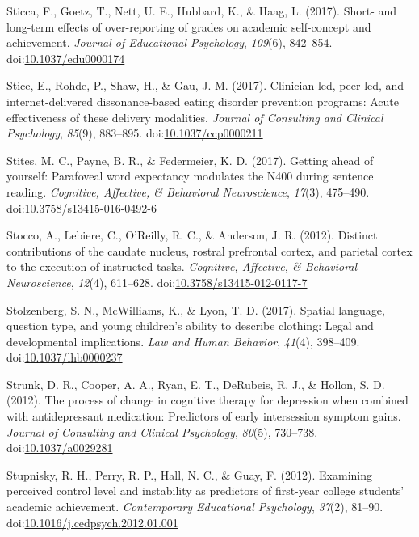 \documentclass[english,man]{apa6}
\theoremstyle{definition}
\theoremstyle{definition}
\theoremstyle{definition}
\theoremstyle{remark}
\begin{document}
\hypertarget{ref-Sticca2017}{}
Sticca, F., Goetz, T., Nett, U. E., Hubbard, K., \& Haag, L. (2017).
Short- and long-term effects of over-reporting of grades on academic
self-concept and achievement. \emph{Journal of Educational Psychology},
\emph{109}(6), 842--854.
doi:\href{https://doi.org/10.1037/edu0000174}{10.1037/edu0000174}

\hypertarget{ref-Stice2017a}{}
Stice, E., Rohde, P., Shaw, H., \& Gau, J. M. (2017). Clinician-led,
peer-led, and internet-delivered dissonance-based eating disorder
prevention programs: Acute effectiveness of these delivery modalities.
\emph{Journal of Consulting and Clinical Psychology}, \emph{85}(9),
883--895.
doi:\href{https://doi.org/10.1037/ccp0000211}{10.1037/ccp0000211}

\hypertarget{ref-Stites2017}{}
Stites, M. C., Payne, B. R., \& Federmeier, K. D. (2017). Getting ahead
of yourself: Parafoveal word expectancy modulates the N400 during
sentence reading. \emph{Cognitive, Affective, \& Behavioral
Neuroscience}, \emph{17}(3), 475--490.
doi:\href{https://doi.org/10.3758/s13415-016-0492-6}{10.3758/s13415-016-0492-6}

\hypertarget{ref-Stocco2012}{}
Stocco, A., Lebiere, C., O'Reilly, R. C., \& Anderson, J. R. (2012).
Distinct contributions of the caudate nucleus, rostral prefrontal
cortex, and parietal cortex to the execution of instructed tasks.
\emph{Cognitive, Affective, \& Behavioral Neuroscience}, \emph{12}(4),
611--628.
doi:\href{https://doi.org/10.3758/s13415-012-0117-7}{10.3758/s13415-012-0117-7}

\hypertarget{ref-Stolzenberg2017}{}
Stolzenberg, S. N., McWilliams, K., \& Lyon, T. D. (2017). Spatial
language, question type, and young children's ability to describe
clothing: Legal and developmental implications. \emph{Law and Human
Behavior}, \emph{41}(4), 398--409.
doi:\href{https://doi.org/10.1037/lhb0000237}{10.1037/lhb0000237}

\hypertarget{ref-Strunk2012}{}
Strunk, D. R., Cooper, A. A., Ryan, E. T., DeRubeis, R. J., \& Hollon,
S. D. (2012). The process of change in cognitive therapy for depression
when combined with antidepressant medication: Predictors of early
intersession symptom gains. \emph{Journal of Consulting and Clinical
Psychology}, \emph{80}(5), 730--738.
doi:\href{https://doi.org/10.1037/a0029281}{10.1037/a0029281}

\hypertarget{ref-Stupnisky2012}{}
Stupnisky, R. H., Perry, R. P., Hall, N. C., \& Guay, F. (2012).
Examining perceived control level and instability as predictors of
first-year college students' academic achievement. \emph{Contemporary
Educational Psychology}, \emph{37}(2), 81--90.
doi:\href{https://doi.org/10.1016/j.cedpsych.2012.01.001}{10.1016/j.cedpsych.2012.01.001}
\end{document}
